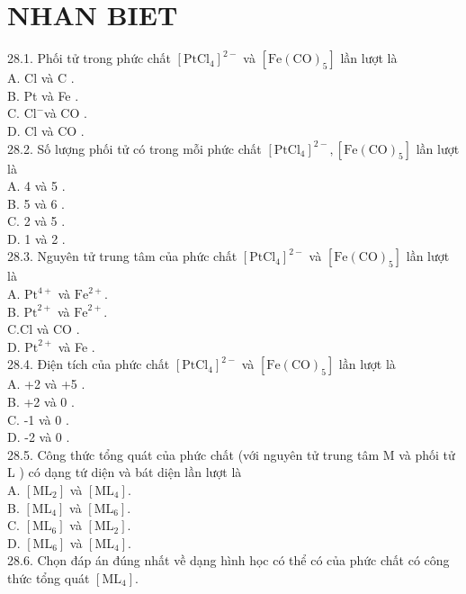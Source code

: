 \documentclass[10pt]{article}
\begin{document}
\section*{NHAN BIET}
28.1. Phối tử trong phức chất $\left[\mathrm{PtCl}_{4}\right]^{2-}$ và $\left[\mathrm{Fe}(\mathrm{CO})_{5}\right]$ lần lượt là\\
A. Cl và C .\\
B. Pt và Fe .\\
C. $\mathrm{Cl}^{-}$và CO .\\
D. Cl và CO .\\
28.2. Số lượng phối tử có trong mỗi phức chất $\left[\mathrm{PtCl}_{4}\right]^{2-},\left[\mathrm{Fe}(\mathrm{CO})_{5}\right]$ lần lượt là\\
A. 4 và 5 .\\
B. 5 và 6 .\\
C. 2 và 5 .\\
D. 1 và 2 .\\
28.3. Nguyên tử trung tâm của phức chất $\left[\mathrm{PtCl}_{4}\right]^{2-}$ và $\left[\mathrm{Fe}(\mathrm{CO})_{5}\right]$ lần lượt là\\
A. $\mathrm{Pt}^{4+}$ và $\mathrm{Fe}^{2+}$.\\
B. $\mathrm{Pt}^{2+}$ và $\mathrm{Fe}^{2+}$.\\
$\mathrm{C} . \mathrm{Cl}$ và CO .\\
D. $\mathrm{Pt}^{2+}$ và Fe .\\
28.4. Điện tích của phức chất $\left[\mathrm{PtCl}_{4}\right]^{2-}$ và $\left[\mathrm{Fe}(\mathrm{CO})_{5}\right]$ lần lượt là\\
A. +2 và +5 .\\
B. +2 và 0 .\\
C. -1 và 0 .\\
D. -2 và 0 .\\
28.5. Công thức tổng quát của phức chất (với nguyên tử trung tâm M và phối tử L ) có dạng tứ diện và bát diện lần lượt là\\
A. $\left[\mathrm{ML}_{2}\right]$ và $\left[\mathrm{ML}_{4}\right]$.\\
B. $\left[\mathrm{ML}_{4}\right]$ và $\left[\mathrm{ML}_{6}\right]$.\\
C. $\left[\mathrm{ML}_{6}\right]$ và $\left[\mathrm{ML}_{2}\right]$.\\
D. $\left[\mathrm{ML}_{6}\right]$ và $\left[\mathrm{ML}_{4}\right]$.\\
28.6. Chọn đáp án đúng nhất về dạng hình học có thể có của phức chất có công thức tổng quát $\left[\mathrm{ML}_{4}\right]$.\\
\end{document}
